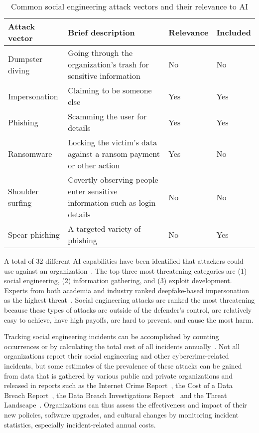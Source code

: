 \begin{table}[h!]  
\centering  
\renewcommand{\arraystretch}{1.5} %
\setlength{\tabcolsep}{5pt} %
\begin{tabularx}{\textwidth}{|l|X|l|l|} %
\hline  
\textbf{Attack vector} & \textbf{Brief description} & \textbf{Relevance} & \textbf{Included} \\ \hline  
Dumpster diving & Going through the organization's trash for sensitive information & No & No \\ \hline  
Impersonation & Claiming to be someone else & Yes & Yes \\ \hline  
Phishing & Scamming the user for details & Yes & Yes \\ \hline  
Ransomware & Locking the victim's data against a ransom payment or other action & Yes & No \\ \hline  
Shoulder surfing & Covertly observing people enter sensitive information such as login details & No & No \\ \hline  
Spear phishing & A targeted variety of phishing & No & Yes \\ \hline  
\end{tabularx}  
\caption{Common social engineering attack vectors and their relevance to AI}  
\label{table:attacks}  
\end{table} 

%
%
A total of 32 different AI capabilities have been identified that attackers could use against an organization~\citep{mirsky_Threat_Offensive_AI_Organizations_2023}. The top three most threatening categories are (1) social engineering, (2) information gathering, and (3) exploit development. Experts from both academia and industry ranked deepfake-based impersonation as the highest threat~\citep{mirsky_Threat_Offensive_AI_Organizations_2023}. Social engineering attacks are ranked the most threatening because these types of attacks are outside of the defender's control, are relatively easy to achieve, have high payoffs, are hard to prevent, and cause the most harm.



%
%
Tracking social engineering incidents can be accomplished by counting occurrences or by calculating the total cost of all incidents annually~\citep{ibm_Cost_Data_Breach_Report_2024}. Not all organizations report their social engineering and other cybercrime-related incidents, but some estimates of the prevalence of these attacks can be gained from data that is gathered by various public and private organizations and released in reports such as the Internet Crime Report~\citep{fbi_Internet_Crime_Report_2023}, the Cost of a Data Breach Report~\citep{ibm_Cost_Data_Breach_Report_2024}, the Data Breach Investigations Report~\citep{verizon_Data_Breach_Investigations_Report_2024} and the Threat Landscape~\citep{eniza_Threat_Landscape_2024}. Organizations can thus assess the effectiveness and impact of their new policies, software upgrades, and cultural changes by monitoring incident statistics, especially incident-related annual costs.




